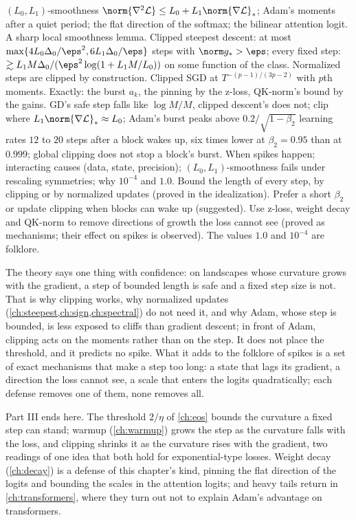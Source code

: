 \begin{refsection}
{$(L_0,L_1)$-smoothness $\norm{\nabla^2\Loss}\le L_0+L_1\norm{\nabla\Loss}_*$; Adam's moments after a quiet period; the flat direction of the softmax; the bilinear attention logit.}
{A sharp local smoothness lemma. Clipped steepest descent: at most $\max\{4L_0\Delta_0/\eps^2,6L_1\Delta_0/\eps\}$ steps with $\norm g_*>\eps$; every fixed step: $\gtrsim L_1M\Delta_0/(\eps^2\log(1+L_1M/L_0))$ on some function of the class. Normalized steps are clipped by construction. Clipped SGD at $T^{-(p-1)/(3p-2)}$ with $p$th moments. Exactly: the burst $a_k$, the pinning by the z-loss, QK-norm's bound by the gains.}
{GD's safe step falls like $\log M/M$, clipped descent's does not; clip where $L_1\norm{\nabla\Loss}_*\approx L_0$; Adam's burst peaks above $0.2/\sqrt{1-\beta_2}$ learning rates $12$ to $20$ steps after a block wakes up, six times lower at $\beta_2=0.95$ than at $0.999$; global clipping does not stop a block's burst.}
{When spikes happen; interacting causes (data, state, precision); $(L_0,L_1)$-smoothness fails under rescaling symmetries; why $10^{-4}$ and $1.0$.}
{Bound the length of every step, by clipping or by normalized updates (proved in the idealization). Prefer a short $\beta_2$ or update clipping when blocks can wake up (suggested). Use z-loss, weight decay and QK-norm to remove directions of growth the loss cannot see (proved as mechanisms; their effect on spikes is observed). The values $1.0$ and $10^{-4}$ are folklore.}

The theory says one thing with confidence: on landscapes whose curvature grows with the gradient, a step of bounded length is safe and a fixed step size is not. That is why clipping works, why normalized updates (\cref{ch:steepest,ch:sign,ch:spectral}) do not need it, and why Adam, whose step is bounded, is less exposed to cliffs than gradient descent; in front of Adam, clipping acts on the moments rather than on the step. It does not place the threshold, and it predicts no spike. What it adds to the folklore of spikes is a set of exact mechanisms that make a step too long: a state that lags its gradient, a direction the loss cannot see, a scale that enters the logits quadratically; each defense removes one of them, none removes all.

Part III ends here. The threshold $2/\eta$ of \cref{ch:eos} bounds the curvature a fixed step can stand; warmup (\cref{ch:warmup}) grows the step as the curvature falls with the loss, and clipping shrinks it as the curvature rises with the gradient, two readings of one idea that both hold for exponential-type losses. Weight decay (\cref{ch:decay}) is a defense of this chapter's kind, pinning the flat direction of the logits and bounding the scales in the attention logits; and heavy tails return in \cref{ch:transformers}, where they turn out not to explain Adam's advantage on transformers.


\end{refsection}
